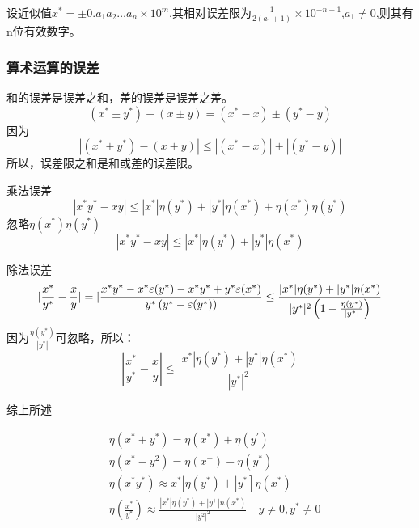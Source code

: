 \documentclass[12pt]{article}
\numberwithin{equation}{section}
\begin{document}
	设近似值$x^* = \pm 0.a_1 a_2 \ldots a_n \times 10^m$,其相对误差限为$\frac{1}{2(a_1 + 1)} \times 10^{-n+1}$,$a_1 \neq 0$,则其有n位有效数字。  

	\subsubsection{算术运算的误差}
	
	和的误差是误差之和，差的误差是误差之差。
	$$
	(x^* \pm y^*) - (x \pm y) = (x^* - x) \pm (y^* - y)
	$$
	因为
	$$
	|(x^* \pm y^*) - (x \pm y)| \leq |(x^* - x)| + |(y^* - y)|
	$$
	所以，误差限之和是和或差的误差限。

	乘法误差
	$$
	|x^* y^* -xy| \leq |x^*| \eta (y^*) + |y^*| \eta (x^*) + \eta(x^*) \eta(y^*)
	$$
	忽略$\eta(x^*) \eta(y^*)$
	$$
	|x^* y^* -xy| \leq |x^*| \eta (y^*) + |y^*| \eta (x^*)
	$$

	除法误差
	$$
	|\frac{x^*}{y^*} - \frac{x}{y}| = |\frac{x^* y^* - x^* \varepsilon (y^*) - x^* y^* + y^* \varepsilon (x^*)}{y^* \left(y^* - \varepsilon(y^*)\right)}  \\
	\leq \frac{|x^*|\eta (y^*) + |y^*|\eta(x^*)}{|y^*|^2 \left(1 - \frac{\eta(y^*)}{|y^*|}\right)}
	$$
	因为$\frac{\eta (y^*)}{|y^*|}$可忽略，所以：
	$$
	|\frac{x^*}{y^*} - \frac{x}{y}| \leq \frac{|x^*|\eta (y^*) + |y^*|\eta(x^*)}{|y^*|^2}
	$$

	综上所述  

	\begin{equation} 
		\begin{split}
			&\eta\left(x^{*}+y^{*}\right)=\eta\left(x^{*}\right)+\eta\left(y^{\prime}\right)\\
			&\eta\left(x^{*}-y^{2}\right)=\eta\left(x^{-}\right)-\eta\left(y^{*}\right)\\
			&\left.\eta\left(x^{*} y^{*}\right) \approx x^{*}\left|\eta\left(y^{*}\right)+\right| y^{*}\right] \eta\left(x^{*}\right)\\
			&\eta\left(\frac{x^{*}}{y^{*}}\right) \approx \frac{\left|x^{*}\right| \eta\left(y^{*}\right)+\left|y^{+}\right| n\left(x^{*}\right)}{\left|y^{2}\right|^{2}} \quad y \neq 0, y^{*} \neq 0
		\end{split}
	\end{equation}
\end{document}
